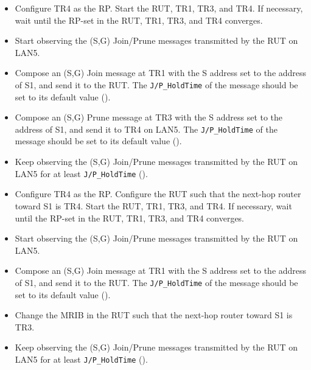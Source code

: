 \documentclass[11pt]{report}
\begin{document}
\begin{itemize}

  \item Configure TR4 as the RP. Start the RUT, TR1, TR3, and TR4. If
  necessary, wait until the RP-set in the RUT, TR1, TR3, and TR4
  converges.

  \item Start observing the (S,G) Join/Prune messages transmitted by the
  RUT on LAN5.

  \item Compose an (S,G) Join message at TR1 with the S address set to the
  address of S1, and send it to the RUT. 
  The \verb=J/P_HoldTime= of the message should be set to its default
  value ({\PimsmJPHoldTime}).

  \item Compose an (S,G) Prune message at TR3 with the S address set to the
  address of S1, and send it to TR4 on LAN5.
  The \verb=J/P_HoldTime= of the message should be set to its default
  value ({\PimsmJPHoldTime}).

  \item Keep observing the (S,G) Join/Prune messages transmitted by the
  RUT on LAN5 for at least \verb=J/P_HoldTime= ({\PimsmJPHoldTime}).

\end{itemize}


\begin{itemize}

  \item Configure TR4 as the RP.
  Configure the RUT such that the next-hop router toward S1 is TR4.
  Start the RUT, TR1, TR3, and TR4.
  If necessary, wait until the RP-set in the RUT, TR1, TR3, and TR4
  converges.

  \item Start observing the (S,G) Join/Prune messages transmitted by the
  RUT on LAN5.

  \item Compose an (S,G) Join message at TR1 with the S address set to the
  address of S1, and send it to the RUT. 
  The \verb=J/P_HoldTime= of the message should be set to its default
  value ({\PimsmJPHoldTime}).

  \item Change the MRIB in the RUT such that the next-hop
  router toward S1 is TR3.

  \item Keep observing the (S,G) Join/Prune messages transmitted by the
  RUT on LAN5 for at least \verb=J/P_HoldTime= ({\PimsmJPHoldTime}).

\end{itemize}
\end{document}
